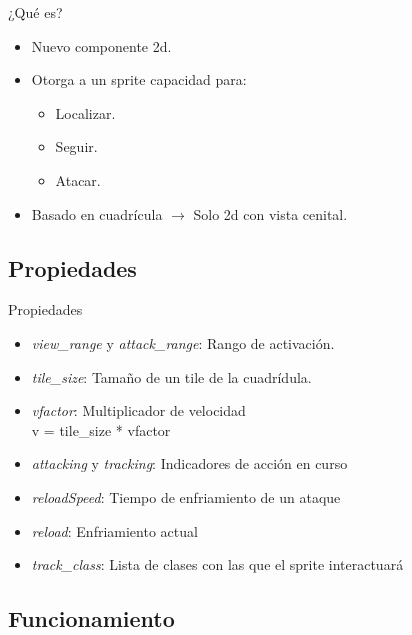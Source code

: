 \documentclass{beamer}
\begin{document}
\begin{frame}{¿Qué es?}
	\begin{itemize}
		\item Nuevo componente 2d.
		\item Otorga a un sprite capacidad para:
		      \begin{itemize}
			      \item Localizar.
			      \item Seguir.
			      \item Atacar.
		      \end{itemize}
		\item Basado en cuadrícula $\rightarrow$ Solo 2d con vista cenital.
	\end{itemize}
\end{frame}

\subsection{Propiedades}

\begin{frame}{Propiedades}
	\begin{itemize}
		\item \textit{view\_range} y \textit{attack\_range}: Rango de activación.
		\item \textit{tile\_size}: Tamaño de un tile de la cuadrídula.
		\item \textit{vfactor}: Multiplicador de velocidad\\
		      \hspace{5mm}v = tile\_size * vfactor
		\item \textit{attacking} y \textit{tracking}: Indicadores de acción en curso
		\item \textit{reloadSpeed}: Tiempo de enfriamiento de un ataque
		\item \textit{reload}: Enfriamiento actual
		\item \textit{track\_class}: Lista de clases con las que el sprite interactuará
	\end{itemize}
\end{frame}

\subsection{Funcionamiento}
\end{document}
